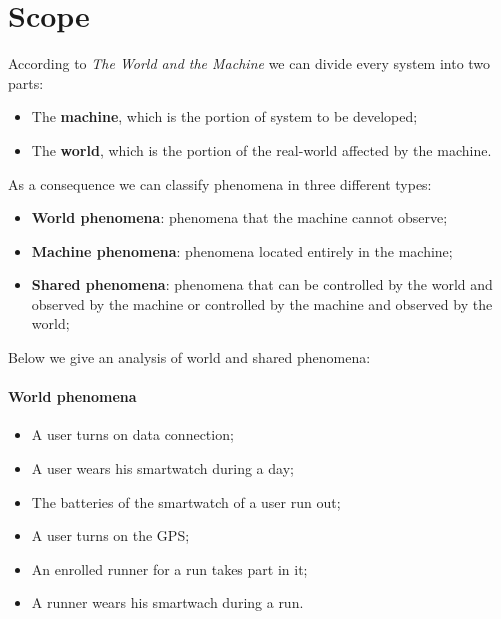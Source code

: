 \section{Scope}
According to \textit{The World and the Machine} \cite{world-machine} we can divide every system into two parts:
\begin{itemize}
  \item The \textbf{machine}, which is the portion of system to be developed;
  \item The \textbf{world}, which is the portion of the real-world affected by the machine.
\end{itemize}
As a consequence we can classify phenomena in three different types:
\begin{itemize}
  \item \textbf{World phenomena}: phenomena that the machine cannot observe;
  \item \textbf{Machine phenomena}: phenomena located entirely in the machine;
  \item \textbf{Shared phenomena}: phenomena that can be controlled by the world and observed by the machine or controlled by the machine and observed by the world;
\end{itemize}
Below we give an analysis of world and shared phenomena:
\paragraph{World phenomena}
\begin{itemize}
  \item A user turns on data connection;
  \item A user wears his smartwatch during a day;
  \item The batteries of the smartwatch of a user run out;
  \item A user turns on the GPS;
  \item An enrolled runner for a run takes part in it;
  \item A runner wears his smartwach during a run.
\end{itemize}
